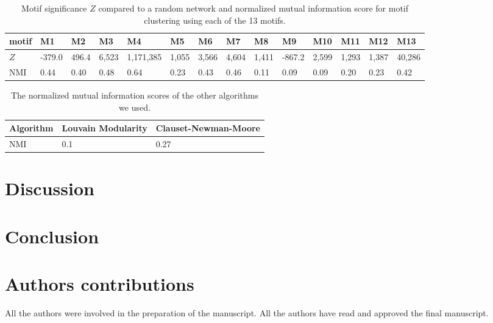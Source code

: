 \begin{table}[t!]
\begin{tabular}{l|lllllllllllll}
    motif & M1 & M2 & M3 & M4 & M5 & M6 & M7 & M8 & M9 & M10 & M11 & M12 & M13
    \\ \hline
    $Z$ & -379.0 & 496.4 & 6,523 & 1,171,385 & 1,055 & 3,566 & 4,604 & 1,411 &
    -867.2 & 2,599 & 1,293 & 1,387 & 40,286 \\
    NMI & 0.44 & 0.40 & 0.48 & 0.64 & 0.23 & 0.43 & 0.46 & 0.11 & 0.09 & 0.09 &
    0.20 & 0.23 & 0.42
  \end{tabular}
  \caption{Motif significance $Z$ compared to a random network and normalized
    mutual information score for motif clustering using each of the 13 motifs.}
  \label{tab:motifs}
\end{table}

\begin{table}[t!]
  \centering
  \begin{tabular}{l|ll}
    Algorithm & Louvain Modularity & Clauset-Newman-Moore \\ \hline
    NMI & 0.1 & 0.27
  \end{tabular}
  \caption{The normalized mutual information scores of the other algorithms we
    used.}
  \label{tab:others}
\end{table}

\section{Discussion}

\section{Conclusion}

\section{Authors contributions}
All the authors were involved in the preparation of the manuscript.
All the authors have read and approved the final manuscript.








